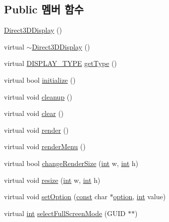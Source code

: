 \subsection*{Public 멤버 함수}
\begin{DoxyCompactItemize}
\item 
\mbox{\hyperlink{class_direct3_d_display_affbd75238a993397fd512e42e7299bc0}{Direct3\+D\+Display}} ()
\item 
virtual \mbox{\hyperlink{class_direct3_d_display_a11987c1fc63954e5cdf7efa717631554}{$\sim$\+Direct3\+D\+Display}} ()
\item 
virtual \mbox{\hyperlink{_display_8h_aa50f63b0688d0250e0be64d8401d09a0}{D\+I\+S\+P\+L\+A\+Y\+\_\+\+T\+Y\+PE}} \mbox{\hyperlink{class_direct3_d_display_a517a805d2a5ebb732671851162920868}{get\+Type}} ()
\item 
virtual bool \mbox{\hyperlink{class_direct3_d_display_a8b8dfd84005816382396677e23d38879}{initialize}} ()
\item 
virtual void \mbox{\hyperlink{class_direct3_d_display_aabdde19c435c484db2e334eca28a8147}{cleanup}} ()
\item 
virtual void \mbox{\hyperlink{class_direct3_d_display_a67b8e31e5bb726cb82efbfb0be90935f}{clear}} ()
\item 
virtual void \mbox{\hyperlink{class_direct3_d_display_a1c789bf663cfd32bb2827b9a0f0429c7}{render}} ()
\item 
virtual void \mbox{\hyperlink{class_direct3_d_display_a099bbef2eaaf90efb3ecb00c68103fe7}{render\+Menu}} ()
\item 
virtual bool \mbox{\hyperlink{class_direct3_d_display_a74e1d9129809bda1014bac928cd0fe52}{change\+Render\+Size}} (\mbox{\hyperlink{_util_8cpp_a0ef32aa8672df19503a49fab2d0c8071}{int}} w, \mbox{\hyperlink{_util_8cpp_a0ef32aa8672df19503a49fab2d0c8071}{int}} h)
\item 
virtual void \mbox{\hyperlink{class_direct3_d_display_a0e6e22fc78ec40c164ec7943581bcf7f}{resize}} (\mbox{\hyperlink{_util_8cpp_a0ef32aa8672df19503a49fab2d0c8071}{int}} w, \mbox{\hyperlink{_util_8cpp_a0ef32aa8672df19503a49fab2d0c8071}{int}} h)
\item 
virtual void \mbox{\hyperlink{class_direct3_d_display_a9fb19225514b70c7178aa871c9852936}{set\+Option}} (\mbox{\hyperlink{getopt1_8c_a2c212835823e3c54a8ab6d95c652660e}{const}} char $\ast$\mbox{\hyperlink{structoption}{option}}, \mbox{\hyperlink{_util_8cpp_a0ef32aa8672df19503a49fab2d0c8071}{int}} value)
\item 
virtual \mbox{\hyperlink{_util_8cpp_a0ef32aa8672df19503a49fab2d0c8071}{int}} \mbox{\hyperlink{class_direct3_d_display_a46be4b83a670d9d29cef2e7131ed46ae}{select\+Full\+Screen\+Mode}} (G\+U\+ID $\ast$$\ast$)
\end{DoxyCompactItemize}


